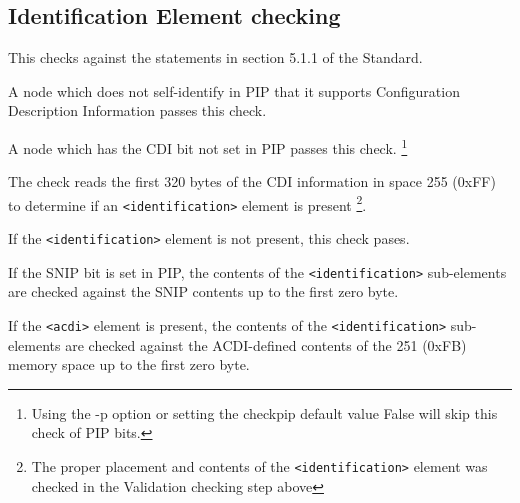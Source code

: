 \documentclass[11pt]{article}
\newcommand*{\xml}[1]{\texttt{<#1>}}
\begin{document}
\subsection{Identification Element checking}

This checks against the statements in section 5.1.1 of the Standard.

A node which does not self-identify in PIP that it supports
Configuration Description Information passes this check.

A node which has the CDI bit not set in PIP passes this check.
\footnote{Using the -p option or setting the checkpip default value False will 
skip this check of PIP bits.}

The check reads the first 320 bytes of the CDI information in space 255 (0xFF) to 
determine if an \xml{identification} element is present
\footnote{The proper placement and contents of the \xml{identification} element
was checked in the Validation checking step above}.  

If the \xml{identification} element is not present, this check pases.

If the SNIP bit is set in PIP, the contents of the \xml{identification}
sub-elements are checked against the SNIP contents
up to the first zero byte.

If the \xml{acdi} element is present, the contents of the 
\xml{identification} sub-elements are checked against the ACDI-defined
contents of the 251 (0xFB) memory space up to the first zero byte.
\end{document}
